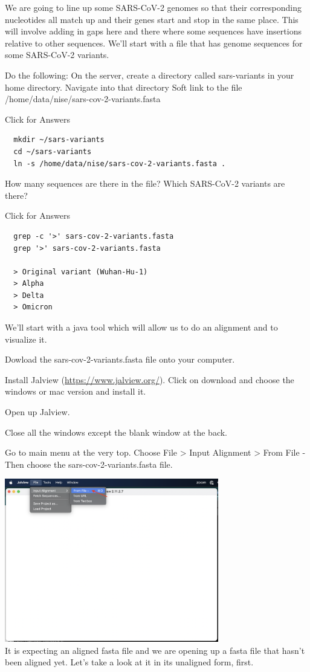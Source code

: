 \documentclass[
]{book}
\begin{document}
We are going to line up some SARS-CoV-2 genomes so that their corresponding nucleotides all match up and their genes start and stop in the same place. This will involve adding in gaps here and there where some sequences have insertions relative to other sequences. We'll start with a file that has genome sequences for some SARS-CoV-2 variants.

Do the following:
On the server, create a directory called sars-variants in your home directory.
Navigate into that directory
Soft link to the file /home/data/nise/sars-cov-2-variants.fasta

Click for Answers

\begin{verbatim}
  mkdir ~/sars-variants
  cd ~/sars-variants
  ln -s /home/data/nise/sars-cov-2-variants.fasta .
\end{verbatim}

\hfill\break

How many sequences are there in the file?
Which SARS-CoV-2 variants are there?

Click for Answers

\begin{verbatim}
  grep -c '>' sars-cov-2-variants.fasta
  grep '>' sars-cov-2-variants.fasta
  
  > Original variant (Wuhan-Hu-1)
  > Alpha
  > Delta
  > Omicron
\end{verbatim}

\hfill\break

We'll start with a java tool which will allow us to do an alignment and to visualize it.

Dowload the sars-cov-2-variants.fasta file onto your computer.

Install Jalview (\url{https://www.jalview.org/}). Click on download and choose the windows or mac version and install it.

Open up Jalview.

Close all the windows except the blank window at the back.

Go to main menu at the very top. Choose File \textgreater{} Input Alignment \textgreater{} From File -
Then choose the sars-cov-2-variants.fasta file.

\includegraphics[width=0.7\textwidth,height=\textheight]{./Figures/open.png}\\
It is expecting an aligned fasta file and we are opening up a fasta file that hasn't been aligned yet. Let's take a look at it in its unaligned form, first.
\end{document}
